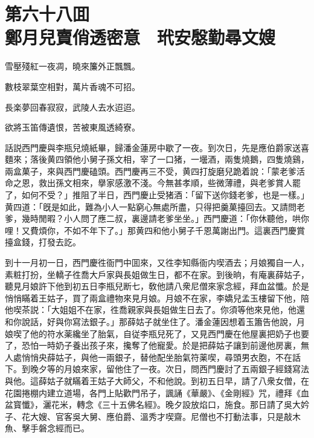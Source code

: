 
\chapter*{第六十八囬　\\鄭月兒賣俏透密意　玳安慇勤尋文嫂}


\begin{myquote}
雪壓殘紅一夜凋，曉來簾外正飄飄。

數枝翠葉空相對，萬片香魂不可招。

長楽夢回春寂寂，武陵人去水迢迢。

欲將玉笛傳遺恨，苦被東風透綺寮。
\end{myquote}

話説西門慶與李瓶兒燒紙畢，歸潘金蓮房中歇了一夜。到次日，先是應伯爵家送喜麵來；落後黄四領他小舅子孫文相，宰了一口猪，一壜酒，兩隻燒鵝，四隻燒鷄，兩盒菓子，來與西門慶磕頭。西門慶再三不受，黄四打旋磨兒跪着說：「蒙老爹活命之恩，救出孫文相來，擧家感激不淺。今無甚孝順，些微薄禮，與老爹賞人罷了，如何不受？」推阻了半日，西門慶止受猪酒：「留下送你錢老爹，也是一樣。」黄四道：「旣是如此，難為小人一點窮心無處所盡，只得把羹菓擡回去。又請問老爹，幾時閒暇？小人問了應二叔，裏邊請老爹坐坐。」西門慶道：「你休聽他，哄你哩！又費煩你，不如不年下了。」那黄四和他小舅子千恩萬謝出門。這裏西門慶賞擡盒錢，打發去訖。

到十一月初一日，西門慶徃衙門中囬來，又徃李知縣衙内喫酒去；月娘獨自一人，素粧打扮，坐轎子徃喬大戶家與長姐做生日，都不在家。到後晌，有庵裏薛姑子，聽見月娘許下他到初五日李瓶兒断七，敎他請八衆尼僧來家念經，拜血盆懺。於是悄悄瞞着王姑子，買了兩盒禮物來見月娘。月娘不在家，李嬌兒孟玉樓留下他，陪他喫茶説：「大姐姐不在家，徃喬親家與長姐做生日去了。你須等他來見他，他還和你說話，好與你寫法銀子。」那薛姑子就坐住了。潘金蓮因想着玉簫告他說，月娘喫了他的符水薬纔坐了胎氣，自従李瓶兒死了，又見西門慶在他屋裏把奶子也要了，恐怕一時奶子養出孩子來，攙奪了他寵愛。於是把薛姑子讓到前邊他房裏，無人處悄悄央薛姑子，與他一兩銀子，替他配坐胎氣符薬喫，尋頭男衣胞，不在話下。到晚夕等的月娘來家，留他住了一夜。次日，問西門慶討了五兩銀子經錢寫法與他。這薛姑子就瞞着王姑子大師父，不和他說。到初五日早，請了八衆女僧，在花園捲棚内建立道場，各門上貼歡門吊子，諷誦《華嚴》、《金剛經》咒，禮拜《血盆寳懺》，灑花米，轉念《三十五佛名經》。晚夕設放焰口，施食。那日請了吳大妗子、花大嫂、官客吳大舅、應伯爵、溫秀才喫齋。尼僧也不打動法事，只是敲木魚、擊手磐念經而已。

